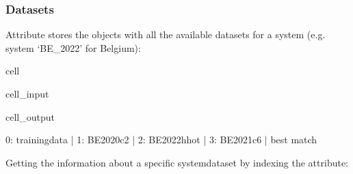 \documentclass[letterpaper,10pt,english]{sphinxmanual}
\begin{document}
\subsubsection{Datasets}
\label{\detokenize{notebooks/userguide:id2}}
\sphinxAtStartPar
Attribute  stores the  objects with all the available datasets for a system (e.g. system ‘BE\_2022’ for Belgium):

\begin{sphinxuseclass}{cell}
\begin{sphinxuseclass}{cell_input}
\begin{sphinxVerbatim}[commandchars=\\\{\}]
\PYG{p}{[}\PYG{p}{]}\PYG{p}{[}\PYG{p}{]}
\end{sphinxVerbatim}

\end{sphinxuseclass}
\begin{sphinxuseclass}{cell_output}
\begin{sphinxVerbatim}[commandchars=\\\{\}]
0: training\PYGZus{}data     |             
1: BE\PYGZus{}2020\PYGZus{}c2        |             
2: BE\PYGZus{}2022\PYGZus{}hhot      |             
3: BE\PYGZus{}2021\PYGZus{}c6        | best match  
\end{sphinxVerbatim}

\end{sphinxuseclass}
\end{sphinxuseclass}
\sphinxAtStartPar
Getting the information about a specific system\sphinxhyphen{}dataset by indexing the  attribute:
\end{document}
